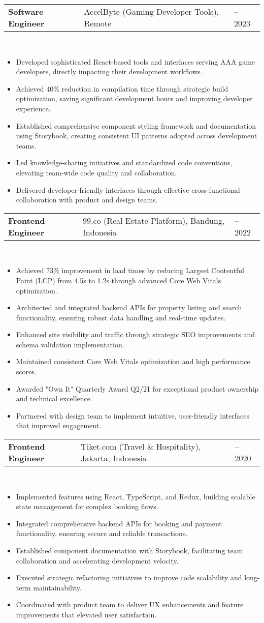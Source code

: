 \documentclass[a4paper, 11pt]{article}
\newcommand{\resumeItem}[1]{
  \item\small{
    {#1 \vspace{-2pt}}
  }
}
\newcommand{\resumeSubheading}[4]{
  \vspace{-2pt}\item
    \begin{tabularx}{0.987\textwidth}[t]{
  >{\raggedright\arraybackslash}X
  >{\centering\arraybackslash}X
  >{\raggedleft\arraybackslash}X }
      \textbf{#1} & #2 & #3 \\
    \end{tabularx}
    \textit{\small#4}\\
    \vspace{-7pt}
}
\newcommand{\resumeItemListStart}{\begin{itemize}[leftmargin=0.22in]}
\newcommand{\resumeItemListEnd}{\end{itemize}\vspace{-20pt}}
\begin{document}
        \resumeSubheading
            {Software Engineer}{AccelByte (Gaming Developer Tools), Remote}{2022 -- 2023}{}
            \resumeItemListStart
                \resumeItem{Developed sophisticated React-based tools and interfaces serving AAA game developers, directly impacting their development workflows.}
                \resumeItem{Achieved 40\% reduction in compilation time through strategic build optimization, saving significant development hours and improving developer experience.}
                \resumeItem{Established comprehensive component styling framework and documentation using Storybook, creating consistent UI patterns adopted across development teams.}
                \resumeItem{Led knowledge-sharing initiatives and standardized code conventions, elevating team-wide code quality and collaboration.}
                \resumeItem{Delivered developer-friendly interfaces through effective cross-functional collaboration with product and design teams.}
            \resumeItemListEnd

        \resumeSubheading
            {Frontend Engineer}{99.co (Real Estate Platform), Bandung, Indonesia}{2020 -- 2022}{}
            \resumeItemListStart
                \resumeItem{Achieved 73\% improvement in load times by reducing Largest Contentful Paint (LCP) from 4.5s to 1.2s through advanced Core Web Vitals optimization.}
                \resumeItem{Architected and integrated backend APIs for property listing and search functionality, ensuring robust data handling and real-time updates.}
                \resumeItem{Enhanced site visibility and traffic through strategic SEO improvements and schema validation implementation.}
                \resumeItem{Maintained consistent Core Web Vitals optimization and high performance scores.}
                \resumeItem{Awarded "Own It" Quarterly Award Q2/21 for exceptional product ownership and technical excellence.}
                \resumeItem{Partnered with design team to implement intuitive, user-friendly interfaces that improved engagement.}
            \resumeItemListEnd

        \resumeSubheading
            {Frontend Engineer}{Tiket.com (Travel \& Hospitality), Jakarta, Indonesia}{2019 -- 2020}{}
            \resumeItemListStart
                \resumeItem{Implemented features using React, TypeScript, and Redux, building scalable state management for complex booking flows.}
                \resumeItem{Integrated comprehensive backend APIs for booking and payment functionality, ensuring secure and reliable transactions.}
                \resumeItem{Established component documentation with Storybook, facilitating team collaboration and accelerating development velocity.}
                \resumeItem{Executed strategic refactoring initiatives to improve code scalability and long-term maintainability.}
                \resumeItem{Coordinated with product team to deliver UX enhancements and feature improvements that elevated user satisfaction.}
            \resumeItemListEnd
\end{document}
